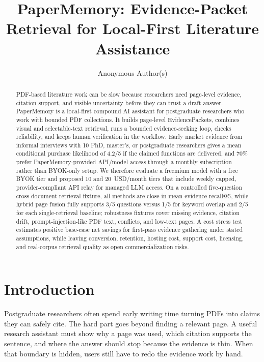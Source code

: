 \documentclass{article}
\title{PaperMemory: Evidence-Packet Retrieval for Local-First Literature Assistance}
\author{Anonymous Author(s)}
\begin{document}
\maketitle

\begin{abstract}
PDF-based literature work can be slow because researchers need page-level evidence, citation support, and visible uncertainty before they can trust a draft answer. PaperMemory is a local-first compound AI assistant for postgraduate researchers who work with bounded PDF collections. It builds page-level EvidencePackets, combines visual and selectable-text retrieval, runs a bounded evidence-seeking loop, checks reliability, and keeps human verification in the workflow. Early market evidence from informal interviews with 10 PhD, master's, or postgraduate researchers gives a mean conditional purchase likelihood of 4.2/5 if the claimed functions are delivered, and 70\% prefer PaperMemory-provided API/model access through a monthly subscription rather than BYOK-only setup. We therefore evaluate a freemium model with a free BYOK tier and proposed 10 and 20~USD/month tiers that include weekly capped, provider-compliant API relay for managed LLM access. On a controlled five-question cross-document retrieval fixture, all methods are close in mean evidence recall@5, while hybrid page fusion fully supports 3/5 questions versus 1/5 for keyword overlap and 2/5 for each single-retrieval baseline; robustness fixtures cover missing evidence, citation drift, prompt-injection-like PDF text, conflicts, and low-text pages. A cost stress test estimates positive base-case net savings for first-pass evidence gathering under stated assumptions, while leaving conversion, retention, hosting cost, support cost, licensing, and real-corpus retrieval quality as open commercialization risks.
\end{abstract}

\section{Introduction}

Postgraduate researchers often spend early writing time turning PDFs into claims they can safely cite. The hard part goes beyond finding a relevant page. A useful research assistant must show why a page was used, which citation supports the sentence, and where the answer should stop because the evidence is thin. When that boundary is hidden, users still have to redo the evidence work by hand.
\end{document}
